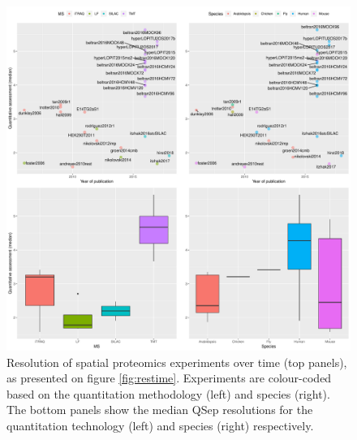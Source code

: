 \documentclass[12pt]{article}\usepackage[]{graphicx}\usepackage[]{color}
\makeatletter
\def\maxwidth{ %
  \ifdim\Gin@nat@width>\linewidth
    \linewidth
  \else
    \Gin@nat@width
  \fi
}
\newenvironment{knitrout}{}{} %
\makeatother
\begin{document}

\begin{figure}[h]
  \centering
\begin{knitrout}
\color{fgcolor}
\includegraphics[width=\maxwidth]{figure/ref2-1} 

\end{knitrout}
\caption{Resolution of spatial proteomics experiments over time (top
  panels), as presented on figure \ref{fig:restime}. Experiments are
  colour-coded based on the quantitation methodology (left) and
  species (right). The bottom panels show the median QSep resolutions
  for the quantitation technology (left) and species (right)
  respectively.}
  \label{fig:ref2}
\end{figure}
\end{document}
